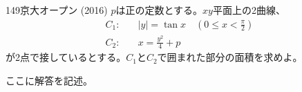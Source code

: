 \begin{thm}{149}{\maru}{京大オープン (2016)}
 $p$は正の定数とする。$xy$平面上の2曲線、
 \begin{align*}
  C_1:\quad & |y|=\tan x \quad (0\le x < \frac{\pi}{2}) \\
  C_2:\quad & x=\frac{y^2}{4}+p
 \end{align*}
 が2点で接しているとする。$C_1$と$C_2$で囲まれた部分の面積を求めよ。
\end{thm}

ここに解答を記述。